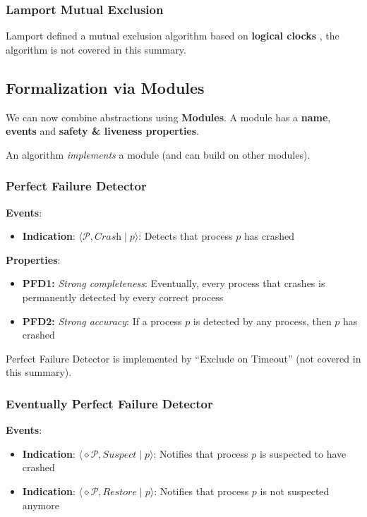 \documentclass[12pt,A4]{extarticle}
\newcommand{\highlight}[1]{\textcolor{highlightColor}{\textbf{#1}}}
\begin{document}
\subsubsection{Lamport Mutual Exclusion}
Lamport defined a mutual exclusion algorithm based on \textbf{logical clocks} \cite{lamportTimeClocks}, the algorithm is not covered in this summary.

\subsection{Formalization via Modules}
We can now combine abstractions using \highlight{Modules}. A module has a \textbf{name}, \textbf{events} and \textbf{safety \& liveness properties}.\par
An algorithm \textit{implements} a module (and can build on other modules).

\newpage
\subsubsection{Perfect Failure Detector}
\textbf{Events}:
\begin{itemize}
  \item{\textbf{Indication}: $\langle \mathcal{P}, \textit{Crash} \mid p \rangle$: Detects that process $p$ has crashed}
\end{itemize}
\textbf{Properties}:
\begin{itemize}
  \item{\textbf{PFD1:} \textit{Strong completeness}: Eventually, every process that crashes is permanently detected by every correct process}
  \item{\textbf{PFD2:} \textit{Strong accuracy}: If a process $p$ is detected by any process, then $p$ has crashed}
\end{itemize}
Perfect Failure Detector is implemented by ``Exclude on Timeout'' (not covered in this summary).

\subsubsection{Eventually Perfect Failure Detector}
\textbf{Events}:
\begin{itemize}
  \item{\textbf{Indication}: $\langle \diamond \mathcal{P}, \textit{Suspect} \mid p \rangle$: Notifies that process $p$ is suspected to have crashed}
  \item {\textbf{Indication}: $\langle \diamond \mathcal{P}, \textit{Restore} \mid p \rangle$: Notifies that process $p$ is not suspected anymore}
\end{itemize}
\end{document}
